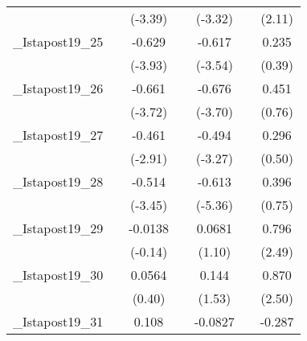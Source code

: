 {\begin{tabular}{l*{6}{c}}
            &                     &     (-3.39)         &                     &     (-3.32)         &                     &      (2.11)         \\
[1em]
\_Istapost19\_25&                     &      -0.629\sym{***}&                     &      -0.617\sym{**} &                     &       0.235         \\
            &                     &     (-3.93)         &                     &     (-3.54)         &                     &      (0.39)         \\
[1em]
\_Istapost19\_26&                     &      -0.661\sym{***}&                     &      -0.676\sym{***}&                     &       0.451         \\
            &                     &     (-3.72)         &                     &     (-3.70)         &                     &      (0.76)         \\
[1em]
\_Istapost19\_27&                     &      -0.461\sym{**} &                     &      -0.494\sym{**} &                     &       0.296         \\
            &                     &     (-2.91)         &                     &     (-3.27)         &                     &      (0.50)         \\
[1em]
\_Istapost19\_28&                     &      -0.514\sym{**} &                     &      -0.613\sym{***}&                     &       0.396         \\
            &                     &     (-3.45)         &                     &     (-5.36)         &                     &      (0.75)         \\
[1em]
\_Istapost19\_29&                     &     -0.0138         &                     &      0.0681         &                     &       0.796\sym{*}  \\
            &                     &     (-0.14)         &                     &      (1.10)         &                     &      (2.49)         \\
[1em]
\_Istapost19\_30&                     &      0.0564         &                     &       0.144         &                     &       0.870\sym{*}  \\
            &                     &      (0.40)         &                     &      (1.53)         &                     &      (2.50)         \\
[1em]
\_Istapost19\_31&                     &       0.108\sym{*}  &                     &     -0.0827         &                     &      -0.287         \\

\end{tabular}}
